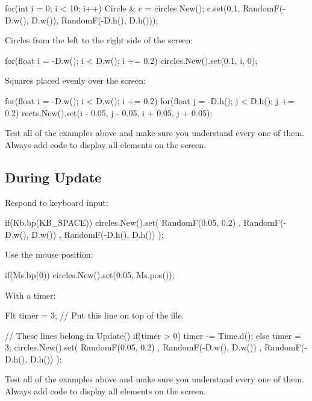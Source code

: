 \begin{code}
for(int i = 0; i < 10; i++)
{
	Circle & c = circles.New();
	c.set(0.1, RandomF(-D.w(), D.w()), RandomF(-D.h(), D.h()));
}
\end{code}

Circles from the left to the right side of the screen:

\begin{code}
for(float i = -D.w(); i < D.w(); i += 0.2) {
  circles.New().set(0.1, i, 0);
}
\end{code}

Squares placed evenly over the screen:
\begin{code}
for(float i = -D.w(); i < D.w(); i += 0.2)
{
	for(float j = -D.h();  j < D.h();  j += 0.2)
	{
		 rects.New().set(i - 0.05, j - 0.05, i + 0.05, j + 0.05);
	}     
}
\end{code}

\begin{exercise}
Test all of the examples above and make sure you understand every one of them. Always add code to display all elements on the screen.
\end{exercise}

\subsection{During Update}

Respond to keyboard input:
\begin{code}
if(Kb.bp(KB_SPACE)) {
  circles.New().set(  RandomF(0.05, 0.2)
	                  , RandomF(-D.w(), D.w())
	                  , RandomF(-D.h(), D.h())
  );
}
\end{code}

Use the mouse position:
\begin{code}
if(Ms.bp(0)) {
  circles.New().set(0.05, Ms.pos());
}
\end{code}

With a timer:
\begin{code}
Flt timer = 3; // Put this line on top of the file. 
               
// These lines belong in Update()
if(timer > 0) timer -= Time.d();
else {
  timer = 3;
	circles.New().set(  RandomF(0.05, 0.2)
	                  , RandomF(-D.w(), D.w())
										, RandomF(-D.h(), D.h())
  );
}
\end{code}

\begin{exercise}
Test all of the examples above and make sure you understand every one of them. Always add code to display all elements on the screen.
\end{exercise}

